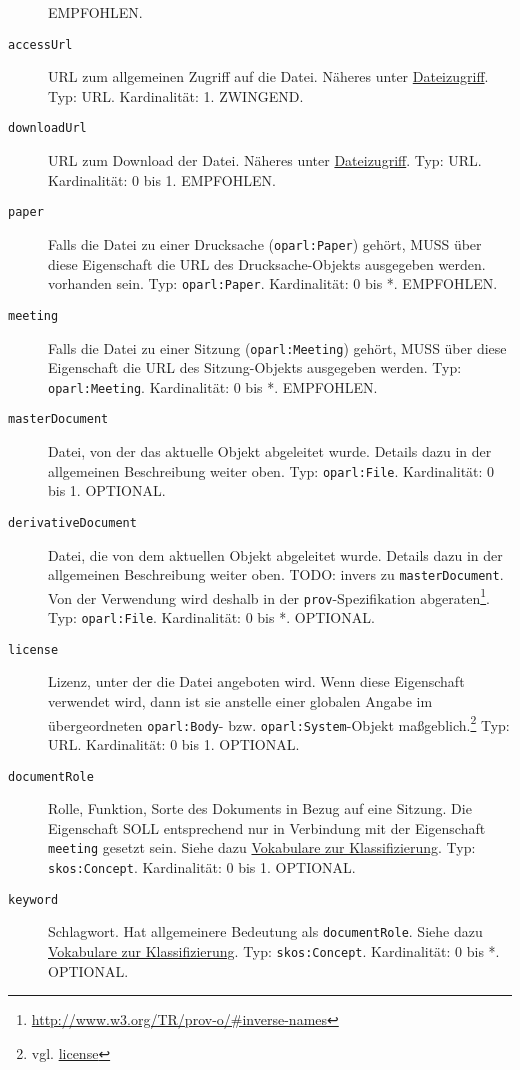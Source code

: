 \documentclass[,a4paper]{article}
\begin{document}
\begin{description}
EMPFOHLEN.
\item[\texttt{accessUrl}]
URL zum allgemeinen Zugriff auf die Datei. Näheres unter
\hyperref[dateizugriff]{Dateizugriff}. Typ: URL. Kardinalität: 1.
ZWINGEND.
\item[\texttt{downloadUrl}]
URL zum Download der Datei. Näheres unter
\hyperref[dateizugriff]{Dateizugriff}. Typ: URL. Kardinalität: 0 bis 1.
EMPFOHLEN.
\item[\texttt{paper}]
Falls die Datei zu einer Drucksache (\texttt{oparl:Paper}) gehört, MUSS
über diese Eigenschaft die URL des Drucksache-Objekts ausgegeben werden.
vorhanden sein. Typ: \texttt{oparl:Paper}. Kardinalität: 0 bis *.
EMPFOHLEN.
\item[\texttt{meeting}]
Falls die Datei zu einer Sitzung (\texttt{oparl:Meeting}) gehört, MUSS
über diese Eigenschaft die URL des Sitzung-Objekts ausgegeben werden.
Typ: \texttt{oparl:Meeting}. Kardinalität: 0 bis *. EMPFOHLEN.
\item[\texttt{masterDocument}]
Datei, von der das aktuelle Objekt abgeleitet wurde. Details dazu in der
allgemeinen Beschreibung weiter oben. Typ: \texttt{oparl:File}.
Kardinalität: 0 bis 1. OPTIONAL.
\item[\texttt{derivativeDocument}]
Datei, die von dem aktuellen Objekt abgeleitet wurde. Details dazu in
der allgemeinen Beschreibung weiter oben. TODO: invers zu
\texttt{masterDocument}. Von der Verwendung wird deshalb in der
\texttt{prov}-Spezifikation abgeraten\footnote{\url{http://www.w3.org/TR/prov-o/\#inverse-names}}.
Typ: \texttt{oparl:File}. Kardinalität: 0 bis *. OPTIONAL.
\item[\texttt{license}]
Lizenz, unter der die Datei angeboten wird. Wenn diese Eigenschaft
verwendet wird, dann ist sie anstelle einer globalen Angabe im
übergeordneten \texttt{oparl:Body}- bzw. \texttt{oparl:System}-Objekt
maßgeblich.\footnote{vgl. \hyperref[eigenschaftux5flicense]{license}}
Typ: URL. Kardinalität: 0 bis 1. OPTIONAL.
\item[\texttt{documentRole}]
Rolle, Funktion, Sorte des Dokuments in Bezug auf eine Sitzung. Die
Eigenschaft SOLL entsprechend nur in Verbindung mit der Eigenschaft
\texttt{meeting} gesetzt sein. Siehe dazu
\hyperref[vokabulareux5fklassifizierung]{Vokabulare zur
Klassifizierung}. Typ: \texttt{skos:Concept}. Kardinalität: 0 bis 1.
OPTIONAL.
\item[\texttt{keyword}]
Schlagwort. Hat allgemeinere Bedeutung als \texttt{documentRole}. Siehe
dazu \hyperref[vokabulareux5fklassifizierung]{Vokabulare zur
Klassifizierung}. Typ: \texttt{skos:Concept}. Kardinalität: 0 bis *.
OPTIONAL.
\end{description}
\end{document}
